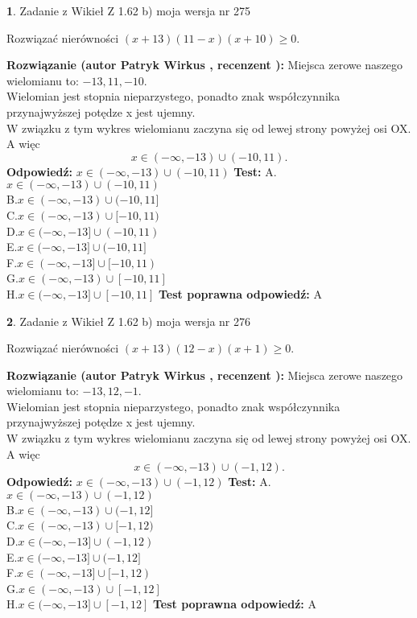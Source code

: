 \documentclass[12pt, a4paper]{article}
\theoremstyle{definition} %
\newtheorem{zad}{}
\newcommand{\zadStart}[1]{\begin{zad}#1\newline}
\newcommand{\zadStop}{\end{zad}}
\newcommand{\rozwStart}[2]{\noindent \textbf{Rozwiązanie (autor #1 , recenzent #2): }\newline}
\newcommand{\rozwStop}{\newline}
\newcommand{\odpStart}{\noindent \textbf{Odpowiedź:}\newline}
\newcommand{\odpStop}{\newline}
\newcommand{\testStart}{\noindent \textbf{Test:}\newline}
\newcommand{\testStop}{\newline}
\newcommand{\kluczStart}{\noindent \textbf{Test poprawna odpowiedź:}\newline}
\newcommand{\kluczStop}{\newline}
\begin{document}
\zadStart{Zadanie z Wikieł Z 1.62 b) moja wersja nr 275}

Rozwiązać nierówności $(x+13)(11-x)(x+10)\ge0$.
\zadStop
\rozwStart{Patryk Wirkus}{}
Miejsca zerowe naszego wielomianu to: $-13, 11, -10$.\\
Wielomian jest stopnia nieparzystego, ponadto znak współczynnika przy\linebreak najwyższej potędze x jest ujemny.\\ W związku z tym wykres wielomianu zaczyna się od lewej strony powyżej osi OX. A więc $$x \in (-\infty,-13) \cup (-10,11).$$
\rozwStop
\odpStart
$x \in (-\infty,-13) \cup (-10,11)$
\odpStop
\testStart
A.$x \in (-\infty,-13) \cup (-10,11)$\\
B.$x \in (-\infty,-13) \cup (-10,11]$\\
C.$x \in (-\infty,-13) \cup [-10,11)$\\
D.$x \in (-\infty,-13] \cup (-10,11)$\\
E.$x \in (-\infty,-13] \cup (-10,11]$\\
F.$x \in (-\infty,-13] \cup [-10,11)$\\
G.$x \in (-\infty,-13) \cup [-10,11]$\\
H.$x \in (-\infty,-13] \cup [-10,11]$
\testStop
\kluczStart
A
\kluczStop



\zadStart{Zadanie z Wikieł Z 1.62 b) moja wersja nr 276}

Rozwiązać nierówności $(x+13)(12-x)(x+1)\ge0$.
\zadStop
\rozwStart{Patryk Wirkus}{}
Miejsca zerowe naszego wielomianu to: $-13, 12, -1$.\\
Wielomian jest stopnia nieparzystego, ponadto znak współczynnika przy\linebreak najwyższej potędze x jest ujemny.\\ W związku z tym wykres wielomianu zaczyna się od lewej strony powyżej osi OX. A więc $$x \in (-\infty,-13) \cup (-1,12).$$
\rozwStop
\odpStart
$x \in (-\infty,-13) \cup (-1,12)$
\odpStop
\testStart
A.$x \in (-\infty,-13) \cup (-1,12)$\\
B.$x \in (-\infty,-13) \cup (-1,12]$\\
C.$x \in (-\infty,-13) \cup [-1,12)$\\
D.$x \in (-\infty,-13] \cup (-1,12)$\\
E.$x \in (-\infty,-13] \cup (-1,12]$\\
F.$x \in (-\infty,-13] \cup [-1,12)$\\
G.$x \in (-\infty,-13) \cup [-1,12]$\\
H.$x \in (-\infty,-13] \cup [-1,12]$
\testStop
\kluczStart
A
\kluczStop
\end{document}
